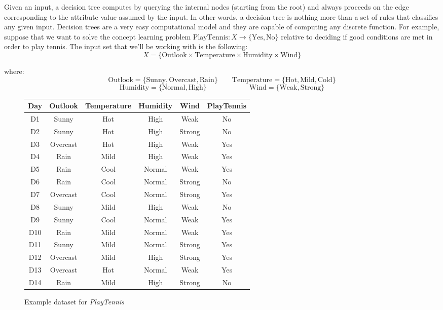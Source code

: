 \documentclass[a4paper, 12pt]{report}
\begin{document}
    Given an input, a decision tree computes by querying the internal nodes (starting from the root) and always proceeds on the edge corresponding to the attribute value assumed by the input. In other words, a decision tree is nothing more than a set of rules that classifies any given input. Decision trees are a very easy computational model and they are capable of computing any discrete function. For example, suppose that we want to solve the concept learning problem $\mathrm{PlayTennis} : X \to \{\mathrm{Yes}, \mathrm{No}\}$ relative to deciding if good conditions are met in order to play tennis. The input set that we'll be working with is the following:
    \[X = \{\mathrm{Outlook} \times \mathrm{Temperature} \times \mathrm{Humidity} \times \mathrm{Wind}\}\]

    where:
    \[\mathrm{Outlook} = \{\mathrm{Sunny}, \mathrm{Overcast}, \mathrm{Rain}\} \qquad \mathrm{Temperature} = \{\mathrm{Hot}, \mathrm{Mild}, \mathrm{Cold}\}\]
    \[\mathrm{Humidity} = \{\mathrm{Normal}, \mathrm{High}\} \qquad\qquad\qquad \mathrm{Wind} = \{\mathrm{Weak}, \mathrm{Strong}\}\]

    \begin{figure}[H]
        \centering
        \begin{tabular}{cccccc}
            Day & Outlook & Temperature & Humidity & Wind & PlayTennis \\
            \hline
            D1 & Sunny & Hot & High & Weak & No \\
            D2 & Sunny & Hot & High & Strong & No \\
            D3 & Overcast & Hot & High & Weak & Yes \\
            D4 & Rain & Mild & High & Weak & Yes \\
            D5 & Rain & Cool & Normal & Weak & Yes \\
            D6 & Rain & Cool & Normal & Strong & No \\
            D7 & Overcast & Cool & Normal & Strong & Yes \\
            D8 & Sunny & Mild & High & Weak & No \\
            D9 & Sunny & Cool & Normal & Weak & Yes \\
            D10 & Rain & Mild & Normal & Weak & Yes \\
            D11 & Sunny & Mild & Normal & Strong & Yes \\
            D12 & Overcast & Mild & High & Strong & Yes \\
            D13 & Overcast & Hot & Normal & Weak & Yes \\
            D14 & Rain & Mild & High & Strong & No
        \end{tabular}
        \caption{Example dataset for \textit{PlayTennis}}
        \label{data_playtennis}
    \end{figure}
\end{document}
